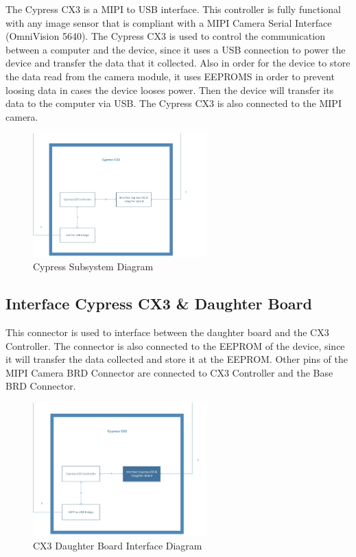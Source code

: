 The Cypress CX3 is a MIPI to USB interface. This controller is fully functional with any image sensor that is compliant with a MIPI Camera Serial Interface (OmniVision 5640). The Cypress CX3 is used to control the communication between a computer and the device, since it uses a USB connection to power the device and transfer the data that it collected. Also in order for the device to store the data read from the camera module, it uses EEPROMS in order to prevent loosing data in cases the device looses power. Then the device will transfer its data to the computer via USB. The Cypress CX3 is also connected to the MIPI camera.
\begin{figure}[h!]
	\centering
 	\includegraphics[width=0.60\textwidth]{images/Cypress}
 \caption{Cypress Subsystem Diagram}
\end{figure}



\subsection{Interface Cypress CX3 & Daughter Board}
This connector is used to interface between the daughter board and the CX3 Controller. The connector is also connected to the EEPROM of the device, since it will transfer the data collected and store it at the EEPROM. Other pins of the MIPI Camera BRD Connector are connected to CX3 Controller and the Base BRD Connector.

\begin{figure}[h!]
	\centering
 	\includegraphics[width=0.60\textwidth]{images/Cypress_Interface}
 \caption{CX3 Daughter Board Interface Diagram}
\end{figure}

